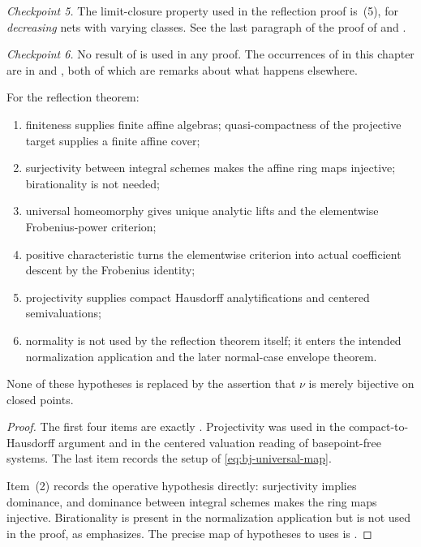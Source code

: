 \emph{Checkpoint 5.}  The limit-closure property used in the reflection proof is
\,(5), for \emph{decreasing} nets with varying
classes.  See the last paragraph of the proof of
 and
.

\emph{Checkpoint 6.}  No result of
 is used in any proof.  The occurrences of
 in this chapter are in
 and
, both of which are remarks about what happens
elsewhere.

\begin{proposition}\label{prop:bj-positive-normalization-ledger}
For the reflection theorem:
\begin{enumerate}
\item finiteness supplies finite affine algebras; quasi-compactness of
      the projective target supplies a finite affine cover;
\item surjectivity between integral schemes makes the affine ring maps
      injective; birationality is not needed;
\item universal homeomorphy gives unique analytic lifts and the elementwise
      Frobenius-power criterion;
\item positive characteristic turns the elementwise criterion into actual
      coefficient descent by the Frobenius identity;
\item projectivity supplies compact Hausdorff analytifications and centered
      semivaluations;
\item normality is not used by the reflection theorem itself; it enters the
      intended normalization application and the later normal-case envelope
      theorem.
\end{enumerate}
None of these hypotheses is replaced by the assertion that $\nu$ is merely
bijective on closed points.
\end{proposition}

\begin{proof}
The first four items are exactly
.
Projectivity was used in the compact-to-Hausdorff argument and in the centered
valuation reading of basepoint-free systems.
The last item records the setup of \eqref{eq:bj-universal-map}.

Item~(2) records the operative hypothesis directly: surjectivity implies
dominance, and dominance between integral schemes makes the ring maps
injective.  Birationality is present in the normalization application but
is not used in the proof, as
 emphasizes.  The precise map of
hypotheses to uses is .
\end{proof}

